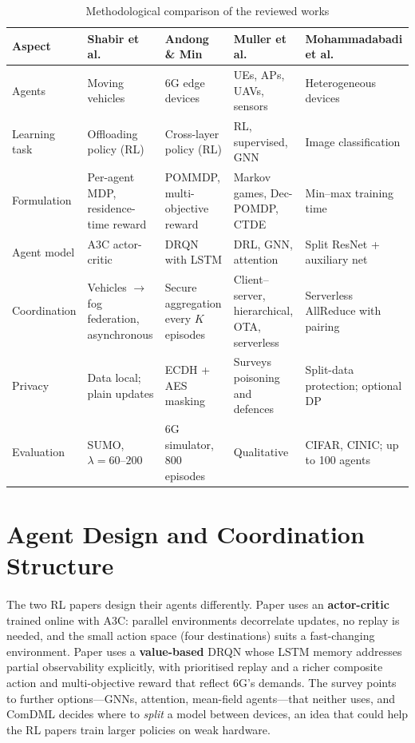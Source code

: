 \documentclass[12pt,a4paper,final]{extreport}
\begin{document}
{\renewcommand{\arraystretch}{1.15}
\begin{table}[htbp]
\centering
\caption{Methodological comparison of the reviewed works}\label{tab:cmp_method}
\small
\begin{tabularx}{\textwidth}{|p{2.2cm}|X|X|X|X|}
\hline
\textbf{Aspect} & \textbf{Shabir et al. \cite{p1}} & \textbf{Andong \& Min \cite{p2}} & \textbf{Muller et al. \cite{p3}} & \textbf{Mohammad\-abadi et al. \cite{p4}} \\ \hline
Agents & Moving vehicles & 6G edge devices & UEs, APs, UAVs, sensors & Heterogeneous devices \\ \hline
Learning task & Offloading policy (RL) & Cross-layer policy (RL) & RL, supervised, GNN & Image classification \\ \hline
Formulation & Per-agent MDP, residence-time reward & POMMDP, multi-objective reward & Markov games, Dec-POMDP, CTDE & Min--max training time \\ \hline
Agent model & A3C actor-critic & DRQN with LSTM & DRL, GNN, attention & Split ResNet + auxiliary net \\ \hline
Coordination & Vehicles $\rightarrow$ fog federation, asynchronous & Secure aggregation every $K$ episodes & Client--server, hierarchical, OTA, serverless & Serverless AllReduce with pairing \\ \hline
Privacy & Data local; plain updates & ECDH + AES masking & Surveys poisoning and defences & Split-data protection; optional DP \\ \hline
Evaluation & SUMO, $\lambda=60$--$200$ & 6G simulator, 800 episodes & Qualitative & CIFAR, CINIC; up to 100 agents \\ \hline
\end{tabularx}
\end{table}}

\section{Agent Design and Coordination Structure}

\paragraph{} The two RL papers design their agents differently. Paper \cite{p1} uses an \textbf{actor-critic} trained online with A3C: parallel environments decorrelate updates, no replay is needed, and the small action space (four destinations) suits a fast-changing environment. Paper \cite{p2} uses a \textbf{value-based} DRQN whose LSTM memory addresses partial observability explicitly, with prioritised replay and a richer composite action and multi-objective reward that reflect 6G's demands. The survey \cite{p3} points to further options---GNNs, attention, mean-field agents---that neither uses, and ComDML \cite{p4} decides where to \emph{split} a model between devices, an idea that could help the RL papers train larger policies on weak hardware.
\end{document}
